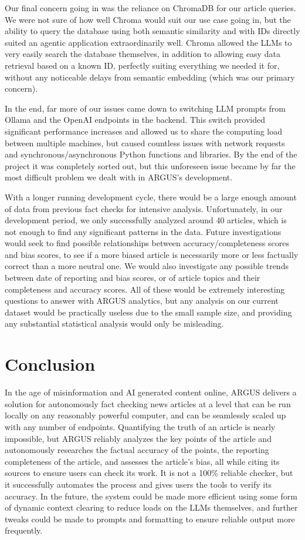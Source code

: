 \documentclass[conference]{IEEEtran}
\begin{document}
Our final concern going in was the reliance on ChromaDB for our article queries. We were not sure of how well Chroma would suit our use case going in, but the ability to query the database using both semantic similarity and with IDs directly suited an agentic application extraordinarily well. Chroma allowed the LLMs to very easily search the database themselves, in addition to allowing easy data retrieval based on a known ID, perfectly suiting everything we needed it for, without any noticeable delays from semantic embedding (which was our primary concern).

In the end, far more of our issues came down to switching LLM prompts from Ollama and the OpenAI endpoints in the backend. This switch provided significant performance increases and allowed us to share the computing load between multiple machines, but caused countless issues with network requests and synchronous/asynchronous Python functions and libraries. By the end of the project it was completely sorted out, but this unforeseen issue became by far the most difficult problem we dealt with in ARGUS's development.

With a longer running development cycle, there would be a large enough amount of data from previous fact checks for intensive analysis. Unfortunately, in our development period, we only successfully analyzed around 40 articles, which is not enough to find any significant patterns in the data. Future investigations would seek to find possible relationships between accuracy/completeness scores and bias scores, to see if a more biased article is necessarily more or less factually correct than a more neutral one. We would also investigate any possible trends between date of reporting and bias scores, or of article topics and their completeness and accuracy scores. All of these would be extremely interesting questions to answer with ARGUS analytics, but any analysis on our current dataset would be practically useless due to the small sample size, and providing any substantial statistical analysis would only be misleading. 

\section{Conclusion}
In the age of misinformation and AI generated content online, ARGUS delivers a solution for autonomously fact checking news articles at a level that can be run locally on any reasonably powerful computer, and can be seamlessly scaled up with any number of endpoints. Quantifying the truth of an article is nearly impossible, but ARGUS reliably analyzes the key points of the article and autonomously researches the factual accuracy of the points, the reporting completeness of the article, and assesses the article's bias, all while citing its sources to ensure users can check its work. It is not a 100\% reliable checker, but it successfully automates the process and gives users the tools to verify its accuracy. In the future, the system could be made more efficient using some form of dynamic context clearing to reduce loads on the LLMs themselves, and further tweaks could be made to prompts and formatting to ensure reliable output more frequently. 
\end{document}

